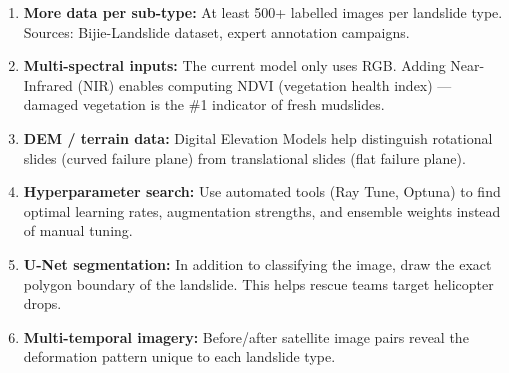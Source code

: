 \documentclass[11pt]{article}
\begin{document}
\begin{enumerate}
    \item \textbf{More data per sub-type:} At least 500+ labelled images per landslide type. Sources: Bijie-Landslide dataset, expert annotation campaigns.

    \item \textbf{Multi-spectral inputs:} The current model only uses RGB. Adding Near-Infrared (NIR) enables computing NDVI (vegetation health index) --- damaged vegetation is the \#1 indicator of fresh mudslides.

    \item \textbf{DEM / terrain data:} Digital Elevation Models help distinguish rotational slides (curved failure plane) from translational slides (flat failure plane).

    \item \textbf{Hyperparameter search:} Use automated tools (Ray Tune, Optuna) to find optimal learning rates, augmentation strengths, and ensemble weights instead of manual tuning.

    \item \textbf{U-Net segmentation:} In addition to classifying the image, draw the exact polygon boundary of the landslide. This helps rescue teams target helicopter drops.

    \item \textbf{Multi-temporal imagery:} Before/after satellite image pairs reveal the deformation pattern unique to each landslide type.
\end{enumerate}
\end{document}
